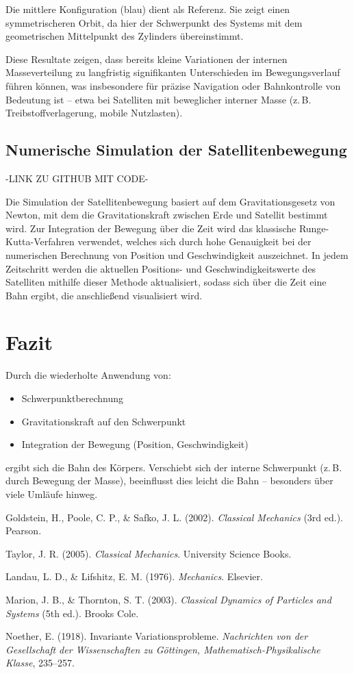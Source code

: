 \documentclass[conference]{IEEEtran}
\begin{document}
Die mittlere Konfiguration (blau) dient als Referenz. Sie zeigt einen symmetrischeren Orbit, da hier der Schwerpunkt des Systems mit dem geometrischen Mittelpunkt des Zylinders übereinstimmt.

Diese Resultate zeigen, dass bereits kleine Variationen der internen Masseverteilung zu langfristig signifikanten Unterschieden im Bewegungsverlauf führen können, was insbesondere für präzise Navigation oder Bahnkontrolle von Bedeutung ist – etwa bei Satelliten mit beweglicher interner Masse (z.\,B. Treibstoffverlagerung, mobile Nutzlasten).


\subsection{Numerische Simulation der Satellitenbewegung}
-LINK ZU GITHUB MIT CODE-

Die Simulation der Satellitenbewegung basiert auf dem Gravitationsgesetz von Newton, mit dem die Gravitationskraft zwischen Erde und Satellit bestimmt wird. Zur Integration der Bewegung über die Zeit wird das klassische Runge-Kutta-Verfahren verwendet, welches sich durch hohe Genauigkeit bei der numerischen Berechnung von Position und Geschwindigkeit auszeichnet. In jedem Zeitschritt werden die aktuellen Positions- und Geschwindigkeitswerte des Satelliten mithilfe dieser Methode aktualisiert, sodass sich über die Zeit eine Bahn ergibt, die anschließend visualisiert wird.


\section{Fazit}

Durch die wiederholte Anwendung von:
\begin{itemize}
  \item Schwerpunktberechnung
  \item Gravitationskraft auf den Schwerpunkt
  \item Integration der Bewegung (Position, Geschwindigkeit)
\end{itemize}
ergibt sich die Bahn des Körpers. Verschiebt sich der interne Schwerpunkt (z.\,B. durch Bewegung der Masse), beeinflusst dies leicht die Bahn – besonders über viele Umläufe hinweg.

\begin{thebibliography}{9}

Goldstein, H., Poole, C. P., \& Safko, J. L. (2002). \textit{Classical Mechanics} (3rd ed.). Pearson.

Taylor, J. R. (2005). \textit{Classical Mechanics}. University Science Books.

Landau, L. D., \& Lifshitz, E. M. (1976). \textit{Mechanics}. Elsevier.

Marion, J. B., \& Thornton, S. T. (2003). \textit{Classical Dynamics of Particles and Systems} (5th ed.). Brooks Cole.

Noether, E. (1918). Invariante Variationsprobleme. \textit{Nachrichten von der Gesellschaft der Wissenschaften zu Göttingen, Mathematisch-Physikalische Klasse}, 235--257.

\end{thebibliography}
\end{document}

